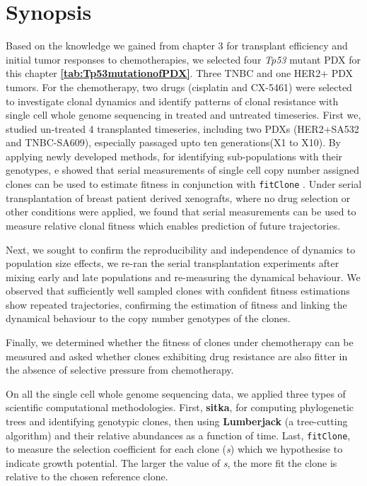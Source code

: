 \section{Synopsis}
Based on the knowledge we gained from chapter 3 for transplant efficiency and initial tumor responses to chemotherapies, we selected four \textit{Tp53} mutant \ac{PDX} for this chapter \textbf{\autoref{tab:Tp53mutationofPDX}}. Three TNBC and one HER2+ \ac{PDX} tumors. For the chemotherapy, two drugs (cisplatin and CX-5461) were selected to investigate clonal dynamics and identify patterns of clonal resistance with single cell whole genome sequencing in treated and untreated timeseries. First we, studied un-treated 4 transplanted timeseries, including two PDXs (HER2+SA532 and TNBC-SA609), especially passaged upto ten generations(X1 to X10). By applying newly developed methods, for identifying sub-populations with their genotypes, 
e showed that serial measurements of single cell copy number assigned clones can be used to estimate fitness in conjunction with \texttt{fitClone} \cite{salehi2020single}. Under serial transplantation of breast patient derived xenografts, where no drug selection or other conditions were applied, we found that serial measurements can be used to measure relative clonal fitness which enables prediction of future trajectories.

Next, we sought to  confirm the reproducibility and independence of dynamics to population size effects, we re-ran the serial transplantation experiments after mixing early and late populations and re-measuring the dynamical behaviour. We observed that sufficiently well sampled clones with confident fitness estimations show repeated trajectories, confirming the estimation of fitness and linking the dynamical behaviour to the copy number genotypes of the clones.

Finally, we determined whether the fitness of clones under chemotherapy can be measured and asked whether clones exhibiting drug resistance are also fitter in the absence of selective pressure from chemotherapy. 

On all the single cell whole genome sequencing data, we applied three types of scientific computational methodologies. First, \textbf{sitka}, for computing phylogenetic trees and identifying genotypic clones, then using \textbf{Lumberjack} (a tree-cutting algorithm) and their relative abundances as a function of time. Last, \texttt{fitClone}, to measure the selection coefficient for each clone (\textit{s}) which we hypothesise to indicate growth potential. The larger the value of \textit{s}, the more fit the clone is relative to the chosen reference clone. 

